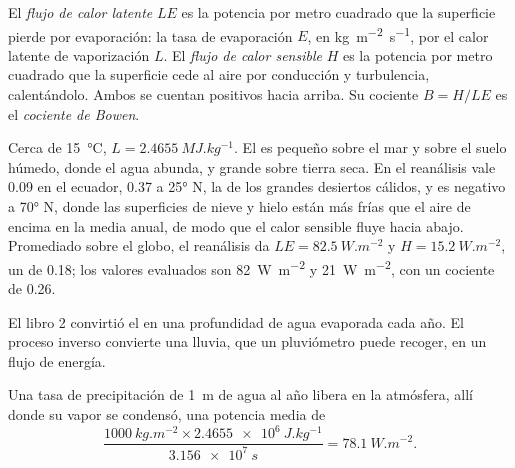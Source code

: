 \begin{definition}\label{def:b1:radiation-heat-transport:surface-fluxes}
El \emph{flujo de calor latente} $LE$ es la potencia por metro cuadrado que la superficie pierde por evaporación: la tasa de evaporación $E$, en
\unit{kg.m^{-2}.s^{-1}}, por el calor latente de vaporización $L$. El
\emph{flujo de calor sensible} $H$ es la potencia por metro cuadrado que la superficie cede al aire por conducción y turbulencia, calentándolo. Ambos se cuentan positivos hacia arriba. Su cociente $B = H/LE$ es el
\emph{cociente de Bowen}.
\end{definition}

Cerca de \qty{15}{\celsius}, $L = \qty{2.4655}{MJ.kg^{-1}}$. El  es pequeño sobre el mar y sobre el suelo húmedo, donde el agua abunda, y grande sobre tierra seca. En el reanálisis vale \num{0.09} en el ecuador, \num{0.37} a \ang{25} N, la  de los grandes desiertos cálidos, y es negativo a \ang{70} N, donde las superficies de nieve y hielo están más frías que el aire de encima en la media anual, de modo que el calor sensible fluye hacia abajo. Promediado sobre el globo, el reanálisis da $LE =
\qty{82.5}{W.m^{-2}}$ y $H = \qty{15.2}{W.m^{-2}}$, un  de \num{0.18}; los valores evaluados son \qty{82}{W.m^{-2}} y \qty{21}{W.m^{-2}}, con un cociente de \num{0.26}.

El libro 2 convirtió el  en una profundidad de agua evaporada cada año. El proceso inverso convierte una lluvia, que un pluviómetro puede recoger, en un flujo de energía.

\begin{proposition}\label{prop:b1:radiation-heat-transport:rain}
Una tasa de precipitación de \qty{1}{m} de agua al año libera en la atmósfera, allí donde su vapor se condensó, una potencia media de
\[
  \frac{\qty{1000}{kg.m^{-2}} \times \qty{2.4655e6}{J.kg^{-1}}}{\qty{3.156e7}{s}}
  = \qty{78.1}{W.m^{-2}} .
\]
\end{proposition}

